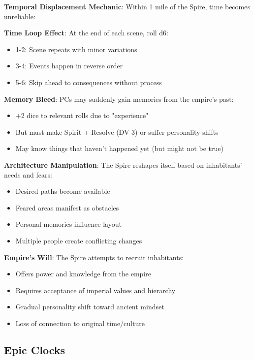 \documentclass[11pt]{article}
\begin{document}
\begin{mdframed}[backgroundcolor=mechanicbg]
\textbf{Temporal Displacement Mechanic}: Within 1 mile of the Spire, time becomes unreliable:

\textbf{Time Loop Effect}: At the end of each scene, roll d6:
\begin{itemize}[leftmargin=*]
\item 1-2: Scene repeats with minor variations
\item 3-4: Events happen in reverse order
\item 5-6: Skip ahead to consequences without process
\end{itemize}

\textbf{Memory Bleed}: PCs may suddenly gain memories from the empire's past:
\begin{itemize}[leftmargin=*]
\item +2 dice to relevant rolls due to "experience"
\item But must make Spirit + Resolve (DV 3) or suffer personality shifts
\item May know things that haven't happened yet (but might not be true)
\end{itemize}

\textbf{Architecture Manipulation}: The Spire reshapes itself based on inhabitants' needs and fears:
\begin{itemize}[leftmargin=*]
\item Desired paths become available
\item Feared areas manifest as obstacles
\item Personal memories influence layout
\item Multiple people create conflicting changes
\end{itemize}

\textbf{Empire's Will}: The Spire attempts to recruit inhabitants:
\begin{itemize}[leftmargin=*]
\item Offers power and knowledge from the empire
\item Requires acceptance of imperial values and hierarchy
\item Gradual personality shift toward ancient mindset
\item Loss of connection to original time/culture
\end{itemize}
\end{mdframed}

\subsection*{Epic Clocks}
\end{document}
